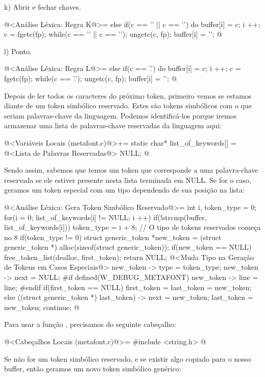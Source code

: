 k) Abrir e fechar chaves.

\iniciocodigo
@<Análise Léxica: Regra K@>=
else if(c == '{' || c == '}'){
  do{
    buffer[i] = c;
    i ++;
    c = fgetc(fp);
  } while(c == '{' || c == '}');
  ungetc(c, fp);
  buffer[i] = '\0';
}
@
\fimcodigo

l) Ponto.

\iniciocodigo
@<Análise Léxica: Regra L@>=
else if(c == '.'){
  do{
    buffer[i] = c;
    i ++;
    c = fgetc(fp);
  } while(c == '.');
  ungetc(c, fp);
  buffer[i] = '\0';
}
@
\fimcodigo

Depois de ler todos os caracteres do próximo token, primeiro vemos se
estamos diante de um token simbólico reservado. Estes são tokens
simbólicos com o que seriam palavras-chave da linguagem. Podemos
identificá-los porque iremos armazenar uma lista de palavras-chave
reservadas da linguagem aqui:

\iniciocodigo
@<Variáveis Locais (metafont.c)@>+=
static char* list_of_keywords[] = {
@<Lista de Palavras Reservadas@>
  NULL};
@
\fimcodigo

Sendo assim, sabemos que temos um token que corresponde a uma
palavra-chave reservada se ele estiver presente nesta lista terminada
em NULL. Se for o caso, geramos um token especial com um tipo
dependendo de sua posição na lista:

\iniciocodigo
@<Análise Léxica: Gera Token Simbólico Reservado@>=
{
  int i, token_type = 0;
  for(i = 0; list_of_keywords[i] != NULL; i ++)
    if(!strcmp(buffer, list_of_keywords[i]))
      token_type = i + 8; // O tipo de tokens reservados começa no 8
  if(token_type != 0){
    struct generic_token *new_token =
       (struct generic_token *) alloc(sizeof(struct generic_token));
    if(new_token == NULL){
      free_token_list(dealloc, first_token);
      return NULL;
    }
    @<Muda Tipo na Geração de Tokens em Casos Especiais@>
    new_token -> type = token_type;
    new_token -> next = NULL;
#if defined(W_DEBUG_METAFONT)
    new_token -> line = line;
#endif
    if(first_token == NULL)
      first_token = last_token = new_token;
    else{
      ((struct generic_token *) last_token) -> next = new_token;
      last_token = new_token;
    }
    continue;
  }
}
@
\fimcodigo

Para usar a função , precisamos do seguinte
cabeçalho:

\iniciocodigo
@<Cabeçalhos Locais (metafont.c)@>=
#include <string.h>
@
\fimcodigo

Se não for um token simbólico reservado, e se existir algo copiado
para o nosso buffer, então geramos um novo token simbólico genérico:

